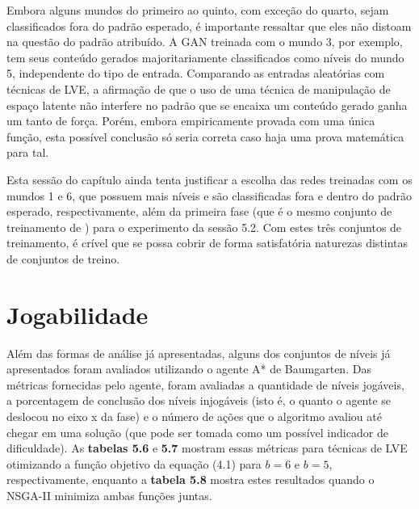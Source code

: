 Embora alguns mundos do primeiro ao quinto, com exceção do quarto, sejam classificados fora do padrão esperado, é importante ressaltar que eles não distoam na questão do padrão atribuído. A GAN treinada com o mundo 3, por exemplo, tem seus conteúdo gerados majoritariamente classificados como níveis do mundo 5, independente do tipo de entrada. Comparando as entradas aleatórias com técnicas de LVE, a afirmação de que o uso de uma técnica de manipulação de espaço latente não interfere no padrão que se encaixa um conteúdo gerado ganha um tanto de força. Porém, embora empiricamente provada com uma única função, esta possível conclusão só seria correta caso haja uma prova matemática para tal.

Esta sessão do capítulo ainda tenta justificar a escolha das redes treinadas com os mundos 1 e 6, que possuem mais níveis e são classificadas fora e dentro do padrão esperado, respectivamente, além da primeira fase (que é o mesmo conjunto de treinamento de \cite{marioGAN}) para o experimento da sessão 5.2. Com estes três conjuntos de treinamento, é crível que se possa cobrir de forma satisfatória naturezas distintas de conjuntos de treino.

\section{Jogabilidade}

Além das formas de análise já apresentadas, alguns dos conjuntos de níveis já apresentados foram avaliados utilizando o agente A* de Baumgarten. Das métricas fornecidas pelo agente, foram avaliadas a quantidade de níveis jogáveis, a porcentagem de conclusão dos níveis injogáveis (isto é, o quanto o agente se deslocou no eixo x da fase) e o número de ações que o algoritmo avaliou até chegar em uma solução (que pode ser tomada como um possível indicador de dificuldade). As \textbf{tabelas 5.6} e \textbf{5.7} mostram essas métricas para técnicas de LVE otimizando a função objetivo da equação (4.1) para $b = 6$ e $b = 5$, respectivamente, enquanto a \textbf{tabela 5.8} mostra estes resultados quando o NSGA-II minimiza ambas funções juntas. 

